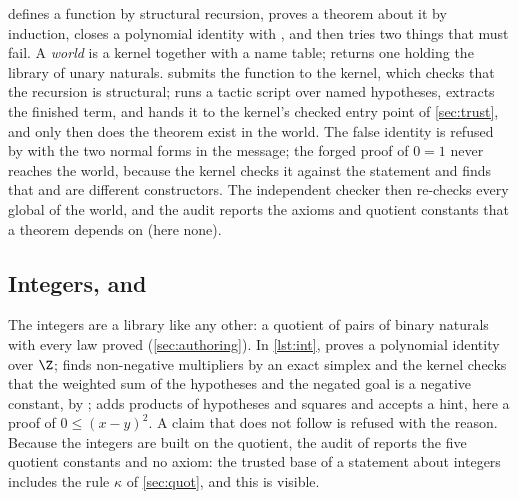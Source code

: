  defines a function by structural recursion, proves a theorem about it by induction, closes a polynomial identity with , and then tries two things that must fail.
A \emph{world} is a kernel together with a name table;  returns one holding the library of unary naturals.
 submits the function to the kernel, which checks that the recursion is structural;  runs a tactic script over named hypotheses, extracts the finished term, and hands it to the kernel's checked entry point of \cref{sec:trust}, and only then does the theorem exist in the world.
The false identity is refused by  with the two normal forms in the message; the forged proof of $0=1$ never reaches the world, because the kernel checks it against the statement and finds that  and  are different constructors.
The independent checker then re-checks every global of the world, and the audit reports the axioms and quotient constants that a theorem depends on (here none).



\subsection{Integers,  and }\label{sec:use-int}

The integers are a library like any other: a quotient of pairs of binary naturals with every law proved (\cref{sec:authoring}).
In \cref{lst:int},  proves a polynomial identity over $\Z$;  finds non-negative multipliers by an exact simplex and the kernel checks that the weighted sum of the hypotheses and the negated goal is a negative constant, by ;  adds products of hypotheses and squares and accepts a hint, here a proof of $0\le(x-y)^2$.
A claim that does not follow is refused with the reason.
Because the integers are built on the quotient, the audit of  reports the five quotient constants and no axiom: the trusted base of a statement about integers includes the rule $\kappa$ of \cref{sec:quot}, and this is visible.



